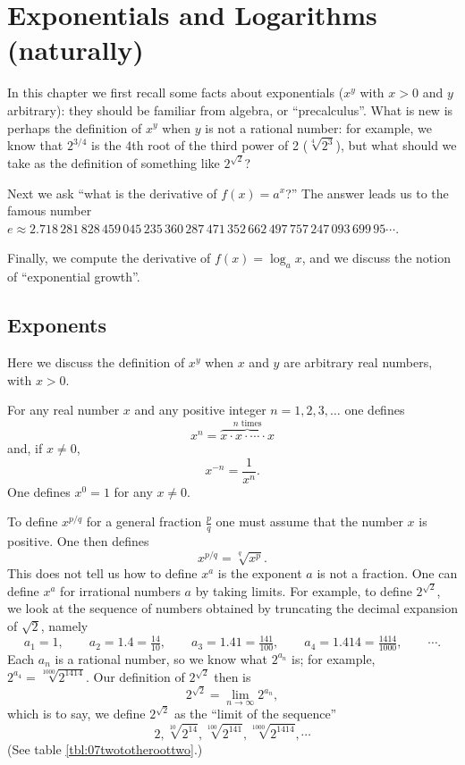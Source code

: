 \chapter{Exponentials and Logarithms (naturally)}
\label{ch:exponentials}
In this chapter we first recall some facts about exponentials ($x^y$ with $x>0$
and $y$ arbitrary): they should be familiar from algebra, or ``precalculus''.
What is new is perhaps the definition of $x^y$ when $y$ is not a rational
number: for example, we know that $2^{3/4}$ is the 4th root of the third power
of 2 ($\sqrt[4]{2^3}$), but what should we take as the definition of something
like $2^{\sqrt{2}}$?

Next we ask ``what is the derivative of $f(x)=a^x$?'' The answer leads us to the
famous number $e\approx 2.718\, 281\, 828\, 459\, 045\, 235\, 360\, 287\, 471\,
352\, 662\, 497\, 757\, 247\, 093\, 699\, 95\cdots$.

Finally, we compute the derivative of $f(x)=\log_a x$, and we discuss the notion
of ``exponential growth''.


\section{Exponents} %
Here we discuss the definition of $x^y$ when $x$ and $y$ are arbitrary
real numbers, with $x>0$.




For any real number $x$ and any positive integer $n=1, 2, 3, \ldots$ one defines
\[
x^n = \overbrace{x\cdot x\cdot \cdots \cdot x}^{\text{$n$ times}}
\]
and, if $x\neq0$,
\[
x^{-n} = \frac1{x^n}.
\]
One defines $x^0=1$ for any $x\ne0$.




To define $x^{p/q}$ for a general fraction $\frac p q$ one must assume
that the number $x$ is positive. One then defines
\begin{equation}\label{eq:pqpowerofx-def}
  x^{p/q}= \sqrt[q]{x^p}.
\end{equation}
This does not tell us how to define $x^a$ is the exponent $a$ is not a fraction.
One can define $x^a$ for irrational numbers $a$ by taking limits.  For example,
to define $2^{\sqrt{2}}$, we look at the sequence of numbers obtained by truncating
the decimal expansion of $\sqrt{2}$, namely
\[
a_1 = 1,
\qquad   a_2= 1.4=\tfrac{14}{10},
\qquad    a_3=1.41=\tfrac{141}{100},
\qquad a_4= 1.414=\tfrac{1414}{1000},
\qquad   \cdots.
\]
Each $a_n$ is a rational number, so we know what $2^{a_n}$ is; for example,
$2^{a_4} = \sqrt[1000]{2^{1414}}$.  Our definition of $2^{\sqrt{2}}$ then is
\[
2^{\sqrt{ 2}} = \lim_{n\to\infty} 2^{a_n},
\]
which is to say, we define $2^{\sqrt{2}}$ as the ``limit of the sequence''
\[
2, \sqrt[10]{2^{14}}, \sqrt[100]{2^{141}}, \sqrt[1000]{2^{1414}}, \cdots
\]
(See table \ref{tbl:07twototheroottwo}.)




